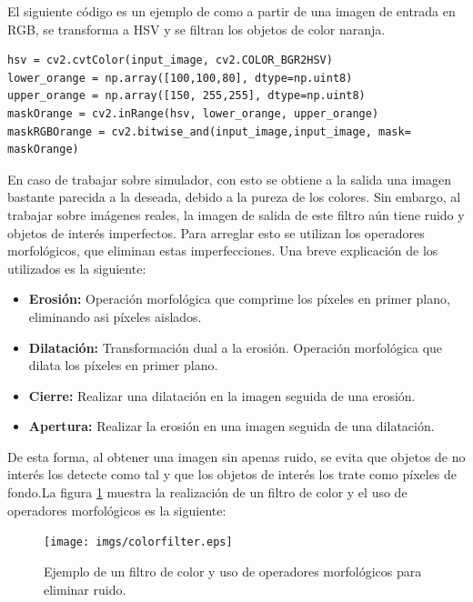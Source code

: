 \hspace{1 cm} El siguiente c\'odigo es un ejemplo de como a partir de una imagen de entrada en RGB, se transforma a HSV y se filtran los objetos de color naranja. 

\begin{lstlisting}[backgroundcolor=\color{yellow}]
hsv = cv2.cvtColor(input_image, cv2.COLOR_BGR2HSV)
lower_orange = np.array([100,100,80], dtype=np.uint8)
upper_orange = np.array([150, 255,255], dtype=np.uint8)
maskOrange = cv2.inRange(hsv, lower_orange, upper_orange)
maskRGBOrange = cv2.bitwise_and(input_image,input_image, mask= maskOrange)
\end{lstlisting}


\hspace{1 cm} En caso de trabajar sobre simulador, con esto se obtiene a la salida una imagen bastante parecida a la deseada, debido a la pureza de los colores. Sin embargo, al trabajar sobre im\'agenes reales, la imagen de salida de este filtro a\'un tiene ruido y objetos de inter\'es imperfectos. Para arreglar esto se utilizan los operadores morfol\'ogicos, que eliminan estas imperfecciones. Una breve explicaci\'on de los utilizados es la siguiente: 

\begin{itemize}
	\item \textbf{Erosi\'on:} Operaci\'on morfol\'ogica que comprime los p\'ixeles en primer plano, eliminando asi p\'ixeles aislados.
	\item \textbf{Dilataci\'on:} Transformaci\'on dual a la erosi\'on. Operaci\'on morfol\'ogica que dilata los p\'ixeles en primer plano.
	\item \textbf{Cierre:} Realizar una dilataci\'on en la imagen seguida de una erosi\'on.
	\item \textbf{Apertura:} Realizar la erosi\'on en una imagen seguida de una dilataci\'on.
\end{itemize}


\hspace{1 cm} De esta forma, al obtener una imagen sin apenas ruido, se evita que objetos de no inter\'es los detecte como tal y que los objetos de inter\'es los trate como p\'ixeles de fondo.La figura \ref{fig:E_Imagen_baliza} muestra la realizaci\'on de un filtro de color y el uso de operadores morfol\'ogicos es la siguiente:

\begin{figure}[ht]
	\centering
		\texttt{[image: imgs/colorfilter.eps]}
         \caption{Ejemplo de un filtro de color y uso de operadores morfol\'ogicos para eliminar ruido.}
	\label{fig:E_Imagen_baliza}
\end{figure}


